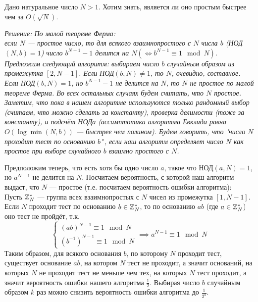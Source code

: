 \begin{problem}
    Дано натуральное число $N > 1$. Хотим знать, является ли оно простым быстрее чем за $O(\sqrt{N})$.

    \it{Решение:} По малой теореме Ферма:\\
    если $N$ --- простое число, то для всякого взаимнопростого с $N$
    числа $b$ (НОД$(N, b) = 1$) число $b^{N - 1} - 1$ делится на $N (\iff b^{N - 1} \equiv 1 \mod N)$.\\
    Предложим следующий алгоритм: выбираем число $b$ случайным образом из промежутка $[2, N - 1]$. Если
    НОД$(b, N) \neq 1$, то $N$, очевидно, составное. Если НОД$(b, N) = 1$, но $b^{N - 1} - 1$ не делится на $N$,
    то $N$ не простое по малой теореме Ферма. Во всех остальных случаях будем считать, что $N$ простое. Заметим,
    что пока в нашем алгоритме используются только рандомный выбор (считаем, что можно сделать за константу),
    проверка делимости (тоже за константу), и подсчёт НОДа (ассимптотика алгоритма Евклида равна
    $O(\log\min(N, b))$ --- быстрее чем полином). Будем говорить, что "число $N$ проходит тест по основанию
    $b$"\,, если наш алгоритм определяет число $N$ как простое при выборе случайного $b$ взаимно простого с $N$.

    Предположим теперь, что есть хотя бы одно число $a$, такое что НОД$(a, N) = 1$, но $a^{N - 1}$ не делится на
    $N$. Посчитаем вероятность, с которой наш алгоритм выдаст, что $N$ --- простое (т.е. посчитаем вероятность
    ошибки алгоритма):\\
    Пусть $\mathbb{Z}_N^{*}$ --- группа всех взаимнопростых с $N$ чисел из промежутка $[1, N-1]$. Если $N$ проходит
    тест по основанию $b \in \mathbb{Z}_N^{*}$, то по основанию $ab$ (где $a \in \mathbb{Z}_N^{*}$) оно тест не пройдёт, т.к.
    \[
        \begin{cases}
            (ab)^{N - 1} \equiv 1 \mod N\\
            (b^{-1})^{N - 1} \equiv 1 \mod N
        \end{cases}
        \implies
        a^{N - 1} \equiv 1 \mod N
    \]
    Таким образом, для всякого основания $b$, по которому $N$ проходит тест, существует основание $ab$,
    на котором $N$ тест не проходит, а значит оснований, на которых $N$ не проходит тест не меньше чем тех,
    на которых $N$ тест проходит, а значит вероятность ошибки нашего алгоритма $\frac{1}{2}$. Выбирая число $b$
    случайным образом $k$ раз можно снизить вероятность ошибки алгоритма до $\frac{1}{2^k}$.
\end{problem}

